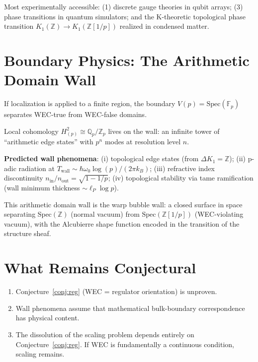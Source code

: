 \documentclass[11pt,a4paper]{article}
\newcommand{\Spec}{\mathrm{Spec}}
\newcommand{\Zp}{\mathbb{Z}[1/p]}
\newcommand{\Qp}{\mathbb{Q}_p}
\newcommand{\Fp}{\mathbb{F}_p}
\begin{document}
Most experimentally accessible: (1) discrete gauge theories in
qubit arrays; (3) phase transitions in quantum simulators;
and the K-theoretic topological phase transition
$K_1(\mathbb{Z}) \to K_1(\Zp)$ realized in condensed matter.

\section{Boundary Physics: The Arithmetic Domain Wall}

If localization is applied to a finite region, the boundary
$V(p) = \Spec(\Fp)$ separates WEC-true from WEC-false domains.

Local cohomology $H^2_{(p)} \cong \Qp/\mathbb{Z}_p$ lives on the wall:
an infinite tower of ``arithmetic edge states'' with
$p^n$ modes at resolution level $n$.

\textbf{Predicted wall phenomena}:
(i) topological edge states (from $\Delta K_1 = \mathbb{Z}$);
(ii) p-adic radiation at $T_{\mathrm{wall}} \sim \hbar\omega_0\log(p)/(2\pi k_B)$;
(iii) refractive index discontinuity $n_{\mathrm{in}}/n_{\mathrm{out}} = \sqrt{1-1/p}$;
(iv) topological stability via tame ramification (wall minimum
thickness $\sim \ell_P\log p$).

This arithmetic domain wall is the warp bubble wall:
a closed surface in space separating $\Spec(\mathbb{Z})$ (normal vacuum)
from $\Spec(\Zp)$ (WEC-violating vacuum), with the Alcubierre
shape function encoded in the transition of the structure sheaf.

\section{What Remains Conjectural}

\begin{enumerate}
\item Conjecture~\ref{conj:reg} (WEC = regulator orientation) is unproven.
\item Wall phenomena assume that mathematical bulk-boundary correspondence has physical content.
\item The dissolution of the scaling problem depends entirely on
  Conjecture~\ref{conj:reg}. If WEC is fundamentally a continuous
  condition, scaling remains.
\end{enumerate}

\newpage
\end{document}
